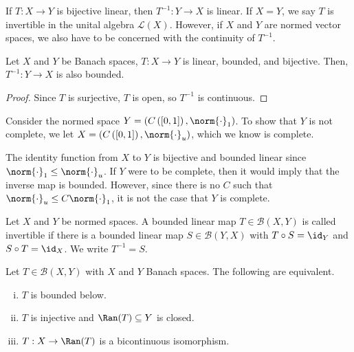 \documentclass[10pt]{mypackage}
\begin{document}
  If $T: X\rightarrow Y$ is bijective linear, then $T^{-1}:Y\rightarrow X$ is linear. If $X = Y$, we say $T$ is invertible in the unital algebra $\mathcal{L}\left(X\right)$. However, if $X$ and $Y$ are normed vector spaces, we also have to be concerned with the continuity of $T^{-1}$.
  \begin{corollary}
    Let $X$ and $Y$ be Banach spaces, $T: X\rightarrow Y$ is linear, bounded, and bijective. Then, $T^{-1}: Y\rightarrow X$ is also bounded.
  \end{corollary}
  \begin{proof}
    Since $T$ is surjective, $T$ is open, so $T^{-1}$ is continuous.
  \end{proof}
  \begin{example}
    Consider the normed space $Y = \left(C\left([0,1]\right),\norm{\cdot}_1\right)$. To show that $Y$ is not complete, we let $X = \left(C\left([0,1]\right),\norm{\cdot}_{u}\right)$, which we know is complete.\newline

    The identity function from $X$ to $Y$ is bijective and bounded linear since $\norm{\cdot}_{1}\leq \norm{\cdot}_u$. If $Y$ were to be complete, then it would imply that the inverse map is bounded. However, since there is no $C$ such that $\norm{\cdot}_u\leq C\norm{\cdot}_1$, it is not the case that $Y$ is complete.
  \end{example}
  \begin{definition}
    Let $X$ and $Y$ be normed spaces. A bounded linear map $T\in \mathcal{B}\left(X,Y\right)$ is called invertible if there is a bounded linear map $S\in \mathcal{B}\left(Y,X\right)$ with $T\circ S = \id_Y$ and $S\circ T = \id_X$. We write $T^{-1} = S$.
  \end{definition}
  \begin{corollary}
    Let $T\in \mathcal{B}\left(X,Y\right)$ with $X$ and $Y$ Banach spaces. The following are equivalent.
    \begin{enumerate}[(i)]
      \item $T$ is bounded below.
      \item $T$ is injective and $\Ran(T)\subseteq Y$ is closed.
      \item $T: X\rightarrow \Ran(T)$ is a bicontinuous isomorphism.
    \end{enumerate}
  \end{corollary}
\end{document}
